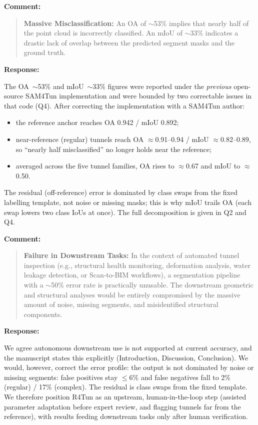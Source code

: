 \documentclass[11pt,a4paper]{article}
\newenvironment{commentblock}{%
  \par\smallskip\noindent\textbf{Comment:}\par
  \begin{quote}\itshape\color{black}
}{%
  \end{quote}\smallskip
}
\newenvironment{responseblock}{%
  \par\smallskip\noindent\textbf{Response:}\par
  \begingroup\color{responsegreen}
}{%
  \endgroup\smallskip
}
\begin{document}
\begin{commentblock}
\textbf{Massive Misclassification:} An OA of $\sim$53\% implies that nearly half of the point cloud is incorrectly classified. An mIoU of $\sim$33\% indicates a drastic lack of overlap between the predicted segment masks and the ground truth.
\end{commentblock}
\begin{responseblock}
The OA~$\sim$53\% and mIoU~$\sim$33\% figures were reported under the \emph{previous} open-source
SAM4Tun implementation and were bounded by two correctable issues in that code (Q4). After
correcting the implementation with a SAM4Tun author:
\begin{itemize}[nosep]
  \item the reference anchor reaches OA 0.942 / mIoU 0.892;
  \item near-reference (regular) tunnels reach OA $\approx$0.91--0.94 / mIoU $\approx$0.82--0.89,
  so ``nearly half misclassified'' no longer holds near the reference;
  \item averaged across the five tunnel families, OA rises to $\approx$0.67 and mIoU to $\approx$0.50.
\end{itemize}
The residual (off-reference) error is dominated by class swaps from the fixed labelling template,
not noise or missing masks; this is why mIoU trails OA (each swap lowers two class IoUs at once).
The full decomposition is given in Q2 and Q4.
\end{responseblock}

\begin{commentblock}
\textbf{Failure in Downstream Tasks:} In the context of automated tunnel inspection (e.g., structural health monitoring, deformation analysis, water leakage detection, or Scan-to-BIM workflows), a segmentation pipeline with a $\sim$50\% error rate is practically unusable. The downstream geometric and structural analyses would be entirely compromised by the massive amount of noise, missing segments, and misidentified structural components.
\end{commentblock}
\begin{responseblock}
We agree autonomous downstream use is not supported at current accuracy, and the manuscript states this explicitly (Introduction, Discussion, Conclusion). We would, however, correct the error profile: the output is not dominated by noise or missing segments: false positives stay $\leq 6\%$ and false negatives fall to 2\% (regular) / 17\% (complex). The residual is class swaps from the fixed template. We therefore position R4Tun as an upstream, human-in-the-loop step (assisted parameter adaptation before expert review, and flagging tunnels far from the reference), with results feeding downstream tasks only after human verification.
\end{responseblock}
\end{document}
